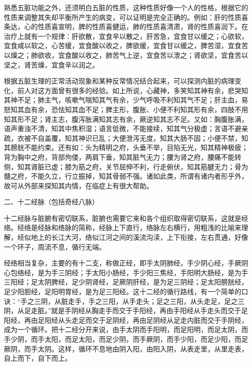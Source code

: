 \documentclass[12pt,UTF8]{ctexbook}
\begin{document}
熟悉五脏功能之外，还须明白五脏的性质，这种性质好像一个人的性格，根据它的性质来调整其失却平衡所产生的病变，可以证明是完全正确的。例如：肝的性质喜条达，心的性质喜宣明，脾的性质喜健运，肺的性质喜清肃，肾的性质喜润下。在治疗上就有一个规律：肝欲散，宜食辛以散之，肝苦急，宜食甘以缓之；心欲软，宜食咸以软之，心苦缓，宜食酸以收之，脾欲缓，宜食甘以缓之，脾苦湿，宜食苦以燥之；肺欲收，宜食酸以收之，肺苦气上逆，宜食苦以泄之；肾欲坚，宜食苦以坚之，肾苦燥，宜食辛以润之。

根据五脏生理的正常活动现象和某种反常情况结合起来，可以探测内脏的病理变化，前人对这方面曾有很多的经验。如上所说，心藏神，多笑知其神有余，悲哭知其神不足；肺主气，咳嗽气喘知其气有余，少气呼吸不利知其气不足；肝主血，易怒知其血有余，恐怯知其血不足；脾主形，腹胀、小便不利知其形有余，四肢不用知其形不足；肾主志，腹泻胀满知其志有余，厥逆知其志不足。又如：胸腹胀满，语声重浊不清，知其中焦积湿；语言低微，不能接续，知其气分极虚；言语不避亲疏，衣被不自盖覆，知其神识已乱；大便泄泻无度，知其大肠不固；小便不禁，知其膀胱不能约束。还有如：头为精明之府，头垂不举，目陷无光，知其精神极疲；背为胸中之府，背部佝偻，两肩下垂，知其脏气无力；腰为肾之府，腰痛不能转侧，知其肾脏已虚；膝为筋之府，关节屈伸不利，行走俯伏，知其筋腱无力；骨为髓之府，不能久立，行立振掉，知其骨弱不强。诸如此类，所谓有诸内者形乎外，故可从外部来探知其内情，在临症上有很大帮助。

二、十二经脉（包括奇经八脉）

十二经脉与脏腑有密切联系，脏腑也需要它来和各个组织取得密切联系，这就是经络。经络是经脉和络脉的简称，经脉上下直行，络脉左右横行，用粗浅的比喻来理解，经似地上的长江大河，络似江河之间的溪流沟渎，上下衔接，左右贯通，好像一个环子，周流不息，循行无端。

经络相当复杂，主要的有十二支，称做正经，即手太阴肺经，手少阴心经，手厥阴心包络经，是为手三阴经；手太阳小肠经，手少阳三焦经，手阳明大肠经，是为手三阳经；足太阴脾经，足少阴肾经，足厥阴肝经，是为足三阴经；足太阳膀胱经，足少阳胆经，足阳明胃经，是为足三阳经。这十二经的循行路线，有一个简单的口诀：“手之三阴，从脏走手，手之三阳，从手走头；足之三阳，从头走足，足之三阴，从足走脏。”就是手阴经从胸走手而交于手阳经，再由手阳经从手走头而交于足阳经，再由足阳经从头走足而交于足阴经，再由足阴经从足走内脏而交于手阴经，成为一个循环。把十二经分开来说，由手太阴而手阳明，而足阳明，而足太阴，而手少阴，而手太阳，而足太阳，而足少阴，而手厥阴，而手少阳，而足少阳，而足厥阴，而手太阴。这样，循环不息地由阴入阳，由阳入阴，从表走里，从里走表，自上而下，自下而上。
\end{document}
